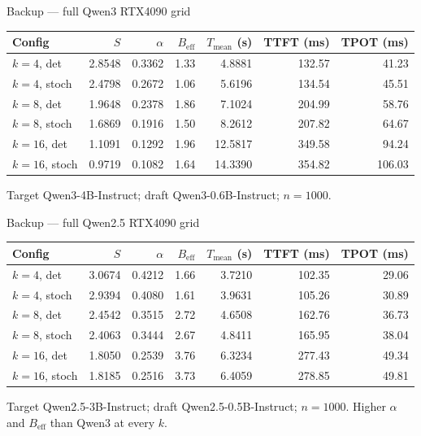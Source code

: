 \documentclass[aspectratio=169, 11pt]{beamer}
\begin{document}
\begin{frame}{Backup --- full Qwen3 RTX4090 grid}
  \centering
  {\small
  \begin{tabular}{@{}l@{\hskip 12pt}NNNNNN@{}}
    \toprule
    \textbf{Config} & $S$ & $\alpha$ & $B_{\text{eff}}$
    & $T_{\text{mean}}$ (s) & TTFT (ms) & TPOT (ms)\\
    \midrule
    $k{=}4$, det    & 2.8548 & 0.3362 & 1.33 & 4.8881  & 132.57 & 41.23\\
    $k{=}4$, stoch  & 2.4798 & 0.2672 & 1.06 & 5.6196  & 134.54 & 45.51\\
    $k{=}8$, det    & 1.9648 & 0.2378 & 1.86 & 7.1024  & 204.99 & 58.76\\
    $k{=}8$, stoch  & 1.6869 & 0.1916 & 1.50 & 8.2612  & 207.82 & 64.67\\
    $k{=}16$, det   & 1.1091 & 0.1292 & 1.96 & 12.5817 & 349.58 & 94.24\\
    $k{=}16$, stoch & 0.9719 & 0.1082 & 1.64 & 14.3390 & 354.82 & 106.03\\
    \bottomrule
  \end{tabular}}
  \vskip10pt
  {\small\color{ink2}Target Qwen3-4B-Instruct; draft Qwen3-0.6B-Instruct; $n{=}1000$.}
\end{frame}

\begin{frame}{Backup --- full Qwen2.5 RTX4090 grid}
  \centering
  {\small
  \begin{tabular}{@{}l@{\hskip 12pt}NNNNNN@{}}
    \toprule
    \textbf{Config} & $S$ & $\alpha$ & $B_{\text{eff}}$
    & $T_{\text{mean}}$ (s) & TTFT (ms) & TPOT (ms)\\
    \midrule
    $k{=}4$, det    & 3.0674 & 0.4212 & 1.66 & 3.7210 & 102.35 & 29.06\\
    $k{=}4$, stoch  & 2.9394 & 0.4080 & 1.61 & 3.9631 & 105.26 & 30.89\\
    $k{=}8$, det    & 2.4542 & 0.3515 & 2.72 & 4.6508 & 162.76 & 36.73\\
    $k{=}8$, stoch  & 2.4063 & 0.3444 & 2.67 & 4.8411 & 165.95 & 38.04\\
    $k{=}16$, det   & 1.8050 & 0.2539 & 3.76 & 6.3234 & 277.43 & 49.34\\
    $k{=}16$, stoch & 1.8185 & 0.2516 & 3.73 & 6.4059 & 278.85 & 49.81\\
    \bottomrule
  \end{tabular}}
  \vskip10pt
  {\small\color{ink2}Target Qwen2.5-3B-Instruct; draft Qwen2.5-0.5B-Instruct; $n{=}1000$.
  Higher $\alpha$ and $B_{\text{eff}}$ than Qwen3 at every $k$.}
\end{frame}
\end{document}
